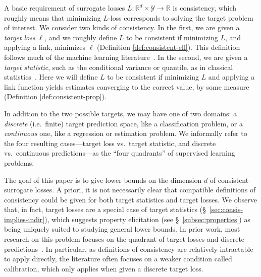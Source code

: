 \documentclass{article}
\newcommand{\Comments}{1}
\newcommand{\mynote}[2]{\ifnum\Comments=1\textcolor{#1}{#2}\fi}
\newcommand{\jessie}[1]{\mynote{purple}{[JF: #1]}}
\newcommand{\bo}[1]{\mynote{blue}{[Bo: #1]}}
\newcommand{\reals}{\mathbb{R}}
\newcommand{\Y}{\mathcal{Y}}
\begin{document}
A basic requirement of surrogate losses $L: \reals^d \times \Y \to \reals$ is consistency, which roughly means that minimizing $L$-loss corresponds to solving the target problem of interest.
We consider two kinds of consistency.
In the first, we are given a \emph{target loss} $\ell$, and we roughly define $L$ to be consistent if minimizing $L$, and applying a link, minimizes $\ell$ (Definition \ref{def:consistent-ell}).
This definition follows much of the machine learning literature~\citep{zhang2004statistical,bartlett2006convexity,tewari2007consistency,steinwart2007compare,ramaswamy2016convex}.
In the second, we are given a \emph{target statistic}, such as the conditional variance or quantile, as in classical statistics~\citep{fisher1922mathematical}.
Here we will define $L$ to be consistent if minimizing $L$ and applying a link function yields estimates converging to the correct value, by some measure (Definition \ref{def:consistent-prop}).

In addition to the two possible targets, we may have one of two domains: a \emph{discrete} (i.e.\ finite) target prediction space, like a classification problem, or a \emph{continuous} one, like a regression or estimation problem.
We informally refer to the four resulting cases---target loss vs.\ target statistic, and discrete vs.\ continuous predictions---as the ``four quadrants'' of supervised learning problems.

The goal of this paper is to give lower bounds on the dimension $d$ of consistent surrogate losses.
A priori, it is not necessarily clear that compatible definitions of consistency could be given for both target statistics and target losses.
We observe that, in fact, target losses are a special case of target statistics (\S~\ref{sec:consis-implies-indir}),
which suggests property elicitation (see \S~\ref{subsec:properties}) as being uniquely suited to studying general lower bounds.
In prior work, most research on this problem focuses on the quadrant of target losses and discrete predictions~\citep{zhang2004statistical,bartlett2006convexity,tewari2007consistency,ramaswamy2015hierarchical,ramaswamy2016convex,ramaswamy2018consistent}.
In particular, as definitions of consistency are relatively intractable to apply directly, the literature often focuses on a weaker condition called calibration, which only applies when given a discrete target loss.
\end{document}
